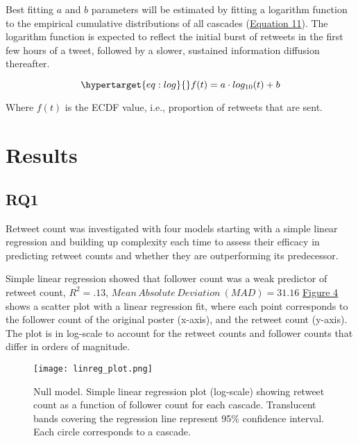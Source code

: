 \documentclass[11pt,a4paper]{article}
\begin{document}
        Best fitting $a$ and $b$ parameters will be estimated by fitting a logarithm function to the empirical cumulative distributions of all cascades (\hyperlink{eq:log}{Equation 11}). The logarithm function is expected to reflect the initial burst of retweets in the first few hours of a tweet, followed by a slower, sustained information diffusion thereafter.
        
        \begin{equation}
            \hypertarget{eq:log}{}
            f(t) = a \cdot log_{10}(t) + b
        \end{equation}

        Where $f(t)$ is the ECDF value, i.e., proportion of retweets that are sent.

\clearpage
\section{Results}

    \subsection{RQ1}
    Retweet count was investigated with four models starting with a simple linear regression and building up complexity each time to assess their efficacy in predicting retweet counts and whether they are outperforming its predecessor.
        
    Simple linear regression showed that follower count was a weak predictor of retweet count, $R^2 = .13$, 
    $Mean \, Absolute \, Deviation \ (MAD) = 31.16$ \hyperlink{fig:null-model}{Figure 4} shows a scatter plot with a linear regression fit, where each point corresponds to the follower count of the original poster (x-axis), and the retweet count (y-axis). The plot is in log-scale to account for the retweet counts and follower counts that differ in orders of magnitude.

    \begin{figure}[H]
        \hypertarget{fig:null-model}{}
        \centering
        \texttt{[image: linreg\_plot.png]}\\
        \caption{Null model. Simple linear regression plot (log-scale) showing retweet count as a function of follower count for each cascade. Translucent bands covering the regression line represent 95\% confidence interval. Each circle corresponds to a cascade.}    
        \label{fig:enter-label}
    \end{figure}
\end{document}
